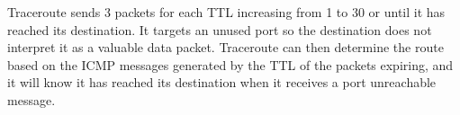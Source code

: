Traceroute sends 3 packets for each TTL increasing from 1 to 30 or until it has reached its destination. It targets an unused port so the destination does not interpret it as a valuable data packet. Traceroute can then determine the route based on the ICMP messages generated by the TTL of the packets expiring, and it will know it has reached its destination when it receives a port unreachable message. 